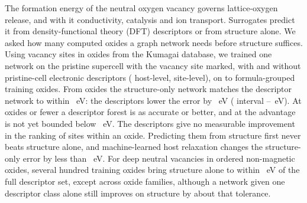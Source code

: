The formation energy of the neutral oxygen vacancy governs lattice-oxygen release, and with it conductivity, catalysis and ion transport. Surrogates predict it from density-functional theory (DFT) descriptors or from structure alone. We asked how many computed oxides a graph network needs before structure suffices. Using \numFilterCascadeStepsFinalSites{} vacancy sites in \numFilterCascadeStepsFinalHosts{} oxides from the Kumagai database, we trained one network on the pristine supercell with the vacancy site marked, with and without \numRfElectronicNFeatures{} pristine-cell electronic descriptors (\numNetDescriptorsHost{} host-level, \numNetDescriptorsSite{} site-level), on \numCfgBudgetsHostsItemOne{} to \numCfgBudgetsMax{} formula-grouped training oxides. From \numNetHeadlineHosts{} oxides the structure-only network matches the descriptor network to within \numNetTolerance{}~eV: the descriptors lower the error by \numNetHeadlineA{}~eV (\pctci{} interval \numNetHeadlineALo{}--\numNetHeadlineAHi{}~eV). At \numCfgBudgetsHostsItemThree{} oxides or fewer a descriptor forest is as accurate or better, and at \numCfgBudgetsHostsItemFive{} the advantage is not yet bounded below \numNetTolerance{}~eV. The descriptors give no measurable improvement in the ranking of sites within an oxide. Predicting them from structure first never beats structure alone, and machine-learned host relaxation changes the structure-only error by less than \numMlipEvalVTwoDMAESSixHundredFiftyFourMlipCiNinetyFiveItemTwo{}~eV. For deep neutral vacancies in ordered non-magnetic oxides, several hundred training oxides bring structure alone to within \numNetTolerance{}~eV of the full descriptor set, except across oxide families, although a network given one descriptor class alone still improves on structure by about that tolerance.
